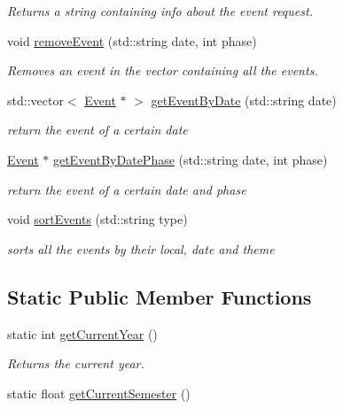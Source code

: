 \begin{DoxyCompactItemize}
\begin{DoxyCompactList}\small\item\em Returns a string containing info about the event request. \end{DoxyCompactList}\item 
void \mbox{\hyperlink{classAssociation_a672445f247a9bab36b87e770f4b0f512}{remove\+Event}} (std\+::string date, int phase)
\begin{DoxyCompactList}\small\item\em Removes an event in the vector containing all the events. \end{DoxyCompactList}\item 
std\+::vector$<$ \mbox{\hyperlink{classEvent}{Event}} $\ast$ $>$ \mbox{\hyperlink{classAssociation_af5a5354a9e84e8441f0bda694966d834}{get\+Event\+By\+Date}} (std\+::string date)
\begin{DoxyCompactList}\small\item\em return the event of a certain date \end{DoxyCompactList}\item 
\mbox{\hyperlink{classEvent}{Event}} $\ast$ \mbox{\hyperlink{classAssociation_af7345aeb4b38410261527c2f170ad707}{get\+Event\+By\+Date\+Phase}} (std\+::string date, int phase)
\begin{DoxyCompactList}\small\item\em return the event of a certain date and phase \end{DoxyCompactList}\item 
void \mbox{\hyperlink{classAssociation_a1f50c2dd311479652c3c5bb17d3770dc}{sort\+Events}} (std\+::string type)
\begin{DoxyCompactList}\small\item\em sorts all the events by their local, date and theme \end{DoxyCompactList}\end{DoxyCompactItemize}
\subsection*{Static Public Member Functions}
\begin{DoxyCompactItemize}
\item 
static int \mbox{\hyperlink{classAssociation_a92f8779f17716e9dcd206f63f888403c}{get\+Current\+Year}} ()
\begin{DoxyCompactList}\small\item\em Returns the current year. \end{DoxyCompactList}\item 
static float \mbox{\hyperlink{classAssociation_a6d31c13ec77d54a1e814ae9528af694a}{get\+Current\+Semester}} ()
\end{DoxyCompactItemize}
